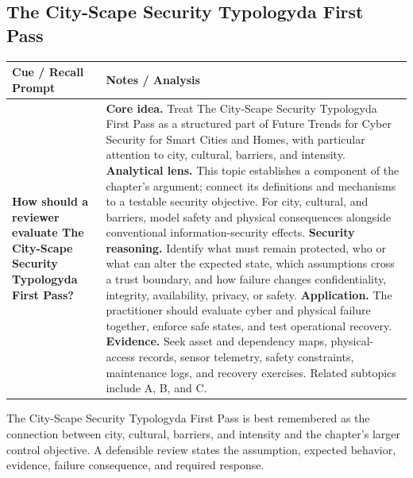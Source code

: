 \documentclass[11pt]{article}
\newcommand{\CornellHeader}{%
\rowcolor{Navy}\color{white}\bfseries Cue / Recall Prompt & \color{white}\bfseries Notes / Analysis\\\hline}
\newcommand{\CornellRow}[2]{%
\cellcolor{CueGray}\RaggedRight\textbf{#1} & \RaggedRight #2\\\hline}
\begin{document}
\subsection*{The City-Scape Security Typologyda First Pass}
\begin{longtable}{>{\RaggedRight\arraybackslash}p{}|>{\RaggedRight\arraybackslash}p{}}
\CornellHeader
\CornellRow{How should a reviewer evaluate The City-Scape Security Typologyda First Pass?}{\textbf{Core idea.} Treat The City-Scape Security Typologyda First Pass as a structured part of Future Trends for Cyber Security for Smart Cities and Homes, with particular attention to city, cultural, barriers, and intensity. \textbf{Analytical lens.} This topic establishes a component of the chapter's argument; connect its definitions and mechanisms to a testable security objective. For city, cultural, and barriers, model safety and physical consequences alongside conventional information-security effects. \textbf{Security reasoning.} Identify what must remain protected, who or what can alter the expected state, which assumptions cross a trust boundary, and how failure changes confidentiality, integrity, availability, privacy, or safety. \textbf{Application.} The practitioner should evaluate cyber and physical failure together, enforce safe states, and test operational recovery. \textbf{Evidence.} Seek asset and dependency maps, physical-access records, sensor telemetry, safety constraints, maintenance logs, and recovery exercises. Related subtopics include A, B, and C.}
\end{longtable}
\begin{topicsummary}
The City-Scape Security Typologyda First Pass is best remembered as the connection between city, cultural, barriers, and intensity and the chapter's larger control objective. A defensible review states the assumption, expected behavior, evidence, failure consequence, and required response.
\end{topicsummary}
\end{document}

